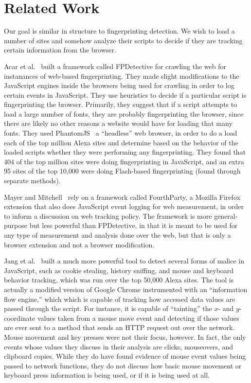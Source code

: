 \documentclass[letterpaper,twocolumn,10pt]{article}
\begin{document}

\section{Related Work}
Our goal is similar in structure to fingerprinting detection. We wish to load a number of sites and somehow analyze their scripts to decide if they are tracking certain information from the browser.

Acar et al.~\cite{fpdetective} built a framework called FPDetective for crawling the web for instanances of web-based fingerprinting. They made slight modifications to the JavaScript engines inside the browsers being used for crawling in order to log certain events in JavaScript. They use heuristics to decide if a particular script is fingerprinting the browser. Primarily, they suggest that if a script attempts to load a large number of fonts, they are probably fingerprinting the browser, since there are likely no other reasons a website would have for loading that many fonts. They used PhantomJS~\cite{phantomjs}
a ``headless'' web browser, in order to do a load each of the top million Alexa sites and determine based on the behavior of the loaded scripts whether they were performing any fingerprinting. They found that 404 of the top million sites were doing fingerprinting in JavaScript, and an extra 95 sites of the top 10,000 were doing Flash-based fingerprinting (found through separate methods).

Mayer and Mitchell~\cite{fourthparty} rely on a framework called FourthParty, a Mozilla Firefox extension that also does JavaScript event logging for web measurement, in order to inform a discussion on web tracking policy. The framework is more general-purpose but less powerful than FPDetective, in that it is meant to be used for any type of measurement and analysis done over the web, but that is only a browser extension and not a browser modification.

Jang et al.~\cite{tainttracking} built a much more powerful tool to detect several forms of malice in JavaScript, such as cookie stealing, history sniffing, and mouse and keyboard behavior tracking, which was run over the top 50,000 Alexa sites. The tool is actually a modified version of Google Chrome instrumented with an ``information flow engine,'' which which is capable of tracking how accessed data values are passed through the script. For instance, it is capable of ``tainting'' the $x$- and $y$-coordinate values taken from a mouse move event and detecting if those values are ever sent to a method that sends an HTTP request out over the network. Mouse movement and key presses were not their focus, however. In fact, the only events whose values they discuss in their analysis are clicks, mouseovers, and clipboard copies. While they do have found evidence of mouse event values being passed to network functions, they do not discuss how basic mouse movement or keyboard press information is being used, or if it is being used at all.
\end{document}
